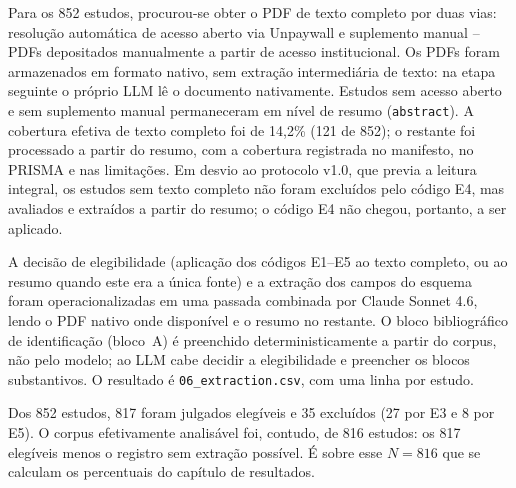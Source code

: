 


Para os 852 estudos, procurou-se obter o PDF de texto completo por duas vias: resolução automática de acesso aberto via Unpaywall e suplemento manual -- PDFs depositados manualmente a partir de acesso institucional. Os PDFs foram armazenados em formato nativo, sem extração intermediária de texto: na etapa seguinte o próprio LLM lê o documento nativamente. Estudos sem acesso aberto e sem suplemento manual permaneceram em nível de resumo (\texttt{abstract}). A cobertura efetiva de texto completo foi de 14,2\% (121 de 852); o restante foi processado a partir do resumo, com a cobertura registrada no manifesto, no PRISMA e nas limitações. Em desvio ao protocolo v1.0, que previa a leitura integral, os estudos sem texto completo não foram excluídos pelo código E4, mas avaliados e extraídos a partir do resumo; o código E4 não chegou, portanto, a ser aplicado.


A decisão de elegibilidade (aplicação dos códigos E1–E5 ao texto completo, ou ao resumo quando este era a única fonte) e a extração dos campos do esquema foram operacionalizadas em uma passada combinada por Claude Sonnet 4.6, lendo o PDF nativo onde disponível e o resumo no restante. O bloco bibliográfico de identificação (bloco~A) é preenchido deterministicamente a partir do corpus, não pelo modelo; ao LLM cabe decidir a elegibilidade e preencher os blocos substantivos. O resultado é \texttt{06\_extraction.csv}, com uma linha por estudo.

Dos 852 estudos, 817 foram julgados elegíveis e 35 excluídos (27 por E3 e 8 por E5). O corpus efetivamente analisável foi, contudo, de 816 estudos: os 817 elegíveis menos o registro sem extração possível. É sobre esse $N = 816$ que se calculam os percentuais do capítulo de resultados.


